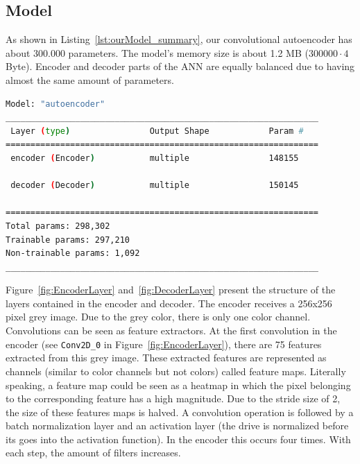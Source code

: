\documentclass[a4paper,12pt, listof=totoc,toc=sectionentrywithdots]{scrartcl}
\begin{document}
\subsection{Model}
As shown in Listing~\ref{lst:ourModel_summary}, our convolutional autoencoder has about 300.000 parameters.
The model's memory size is about 1.2 MB ($300000 \cdot 4$ Byte).
Encoder and decoder parts of the ANN are equally balanced due to having almost the same amount of parameters.

\begin{lstlisting}[language=bash, caption=Parameter amount of our model (output of \texttt{summary()} call)., label={lst:ourModel_summary}, basicstyle=\fontsize{11}{9}\selectfont\ttfamily]
 Model: "autoencoder"
_______________________________________________________________
 Layer (type)                Output Shape            Param #   
===============================================================
 encoder (Encoder)           multiple                148155    
                                                               
 decoder (Decoder)           multiple                150145    
                                                                 
===============================================================
Total params: 298,302
Trainable params: 297,210
Non-trainable params: 1,092
_______________________________________________________________
\end{lstlisting}


Figure~\ref{fig:EncoderLayer} and~\ref{fig:DecoderLayer} present the structure of the layers contained in the encoder and decoder.
The encoder receives a 256x256 pixel grey image.
Due to the grey color, there is only one color channel.
Convolutions can be seen as feature extractors.
At the first convolution in the encoder (see \texttt{Conv2D\_0} in Figure~\ref{fig:EncoderLayer}), there are 75 features extracted from this grey image.
These extracted features are represented as channels (similar to color channels but not colors) called feature maps.
Literally speaking, a feature map could be seen as a heatmap in which the pixel belonging to the corresponding feature has a high magnitude.
Due to the stride size of 2, the size of these features maps is halved.
A convolution operation is followed by a batch normalization layer and an activation layer (the drive is normalized before its goes into the activation function).
In the encoder this occurs four times.
With each step, the amount of filters increases.
\end{document}
